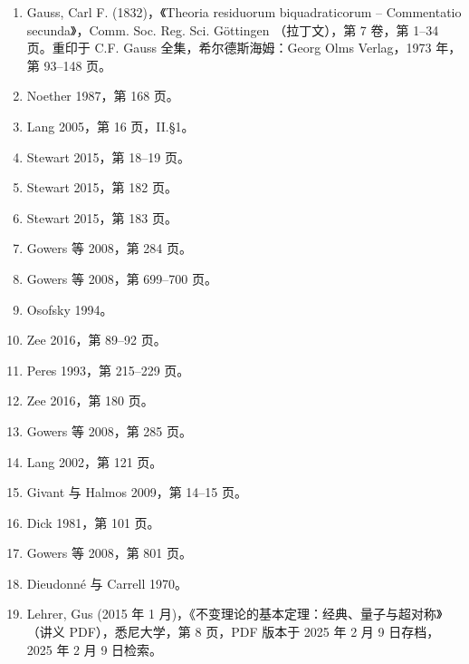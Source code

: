 \begin{enumerate}
\item Gauss, Carl F. (1832)，《Theoria residuorum biquadraticorum – Commentatio secunda》，Comm. Soc. Reg. Sci. Göttingen （拉丁文），第 7 卷，第 1–34 页。重印于 C.F. Gauss 全集，希尔德斯海姆：Georg Olms Verlag，1973 年，第 93–148 页。
\item Noether 1987，第 168 页。
\item Lang 2005，第 16 页，II.§1。
\item Stewart 2015，第 18–19 页。
\item Stewart 2015，第 182 页。
\item Stewart 2015，第 183 页。
\item Gowers 等 2008，第 284 页。
\item Gowers 等 2008，第 699–700 页。
\item Osofsky 1994。
\item Zee 2016，第 89–92 页。
\item Peres 1993，第 215–229 页。
\item Zee 2016，第 180 页。
\item Gowers 等 2008，第 285 页。
\item Lang 2002，第 121 页。
\item Givant 与 Halmos 2009，第 14–15 页。
\item Dick 1981，第 101 页。
\item Gowers 等 2008，第 801 页。
\item Dieudonné 与 Carrell 1970。
\item Lehrer, Gus (2015 年 1 月)，《不变理论的基本定理：经典、量子与超对称》（讲义 PDF），悉尼大学，第 8 页，PDF 版本于 2025 年 2 月 9 日存档，2025 年 2 月 9 日检索。

\end{enumerate}
